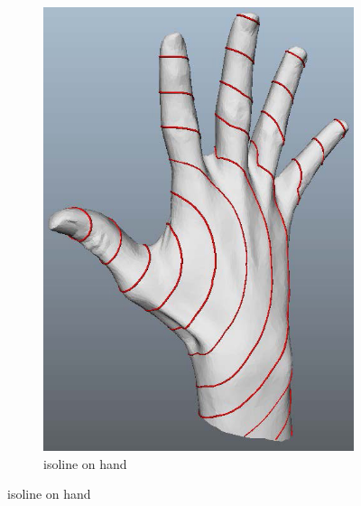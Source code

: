 \begin{figure}
\begin{subfigure}[b]{0.5\textwidth}
                \includegraphics[width=\textwidth]{../images/geodesic_image/hand_isoline-1}
                \caption{isoline on hand}
                \label{fig:hand_iso}
        \end{subfigure}
        

\end{figure}
